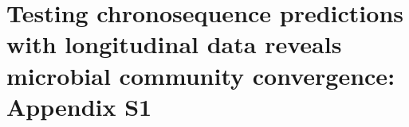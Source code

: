 \chapter{Testing chronosequence predictions with longitudinal data reveals microbial community convergence: Appendix S1}
\fancyhead[LE, RO]{\thepage}
\fancyfoot{}
\renewcommand{\headrulewidth}{0pt}
\setlength{\parindent}{1cm}

